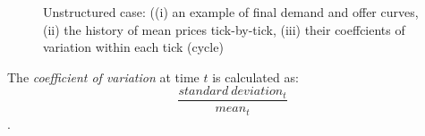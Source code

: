\documentclass[12pt]{report}
\begin{document}
\begin{figure}[htbp]
\begin{center}
\caption{Unstructured case: ((i) an example of final demand and offer curves, (ii) the history of mean prices tick-by-tick, (iii) their coeffcients of variation within each tick (cycle)}
\label{output_4_1.png}
\end{center}
\end{figure}

The \emph{coefficient of variation} at time $t$ is calculated as: $$\frac{standard~deviation_t}{mean_t}$$.
\end{document}
